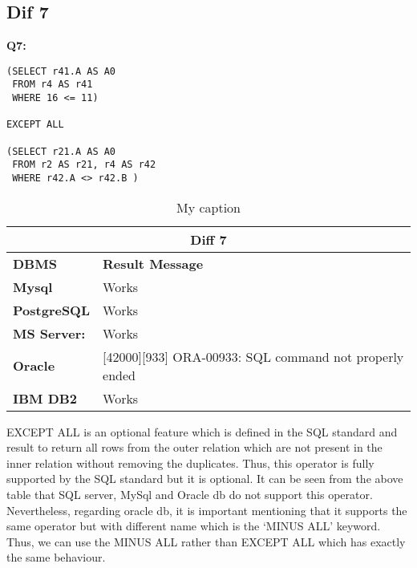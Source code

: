 \subsection{Dif 7}
  
\begin{mdframed}[backgroundcolor=lightgray!20] 
\textbf{Q7:}
\begin{lstlisting}
(SELECT r41.A AS A0
 FROM r4 AS r41
 WHERE 16 <= 11)
 
EXCEPT ALL

(SELECT r21.A AS A0
 FROM r2 AS r21, r4 AS r42
 WHERE r42.A <> r42.B )
\end{lstlisting}
\end{mdframed}

\begin{table}[h]
\centering
\caption{My caption}
\label{my-label}
\begin{tabular}{|p{2cm}|p{12cm}|}
\hline
\multicolumn{2}{|c|}{\textbf{Diff 7}}                                                                       \\ \hline
\textbf{DBMS}                              & \textbf{Result Message}                                        \\ \hline
{\color[HTML]{333333} \textbf{Mysql}}      & {\color[HTML]{333333} Works}                                   \\ \hline
{\color[HTML]{333333} \textbf{PostgreSQL}} & {\color[HTML]{333333} Works}                                   \\ \hline
{\color[HTML]{333333} \textbf{MS Server:}} & {\color[HTML]{333333} Works}                                   \\ \hline
\textbf{Oracle}                            & {[}42000{]}{[}933{]} ORA-00933: SQL command not properly ended \\ \hline
\textbf{IBM DB2}                           & Works                                                          \\ \hline
\end{tabular}
\end{table}

EXCEPT ALL is an optional feature which is defined in the SQL standard and result to return all rows from the outer relation which are not present in the inner relation without removing the duplicates. Thus, this operator is fully supported by the SQL standard but it is optional.  It can be seen from the above table that SQL server, MySql and Oracle db do not support this operator. Nevertheless, regarding oracle db, it is important mentioning that it supports the same operator but with different name which is the ‘MINUS ALL’ keyword. Thus, we can use the MINUS ALL rather than EXCEPT ALL which has exactly the same behaviour.   



